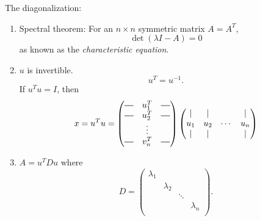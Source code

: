 \newcommand*{\horzbar}{\rule[.5ex]{2.5ex}{0.5pt}}
\begin{prev}
	The diagonalization:
	\begin{enumerate}
		\item Spectral theorem: For an \(n\times n\)  symmetric matrix \(A = A^{T}\),
		      \[
			      \det(\lambda I - A) = 0
		      \]
		      as known as the \emph{characteristic equation}.
		\item \(u\) is invertible.
		      \[
			      u^{T} = u^{-1}.
		      \]
		      If \(u^{T}u = I\), then
		      \[
			      x = u^{T}u = \begin{pmatrix}
				      \horzbar & u^{T}_1 & \horzbar \\
				      \horzbar & u^{T}_2 & \horzbar \\
				               & \vdots  &          \\
				      \horzbar & v^{T}_n & \horzbar \\
			      \end{pmatrix}\begin{pmatrix}
				      \mid & \mid &        & \mid \\
				      u_1  & u_2  & \cdots & u_n  \\
				      \mid & \mid &        & \mid \\
			      \end{pmatrix}
		      \]
		\item \(A = u^{T} D u\)  where \[
			      D  = \begin{pmatrix}
				      \lambda_1 &           &        &           \\
				                & \lambda_2 &        &           \\
				                &           & \ddots &           \\
				                &           &        & \lambda_n \\
			      \end{pmatrix}.
		      \]
	\end{enumerate}
\end{prev}

